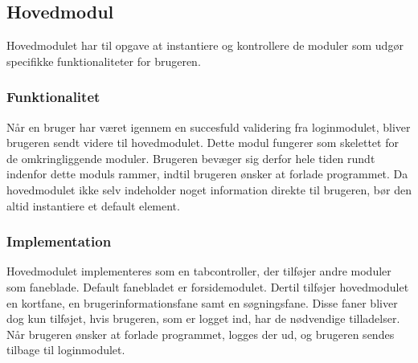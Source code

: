 \subsection{Hovedmodul}
\label{sub:hovedmodul}

Hovedmodulet har til opgave at instantiere og kontrollere de moduler som udgør specifikke funktionaliteter for brugeren.

\subsubsection{Funktionalitet}
\label{ssub:hovedmodul_funktionalitet}

Når en bruger har været igennem en succesfuld validering fra loginmodulet, bliver brugeren sendt videre til hovedmodulet.  Dette modul fungerer som skelettet for de omkringliggende moduler. Brugeren bevæger sig derfor hele tiden rundt indenfor dette moduls rammer, indtil brugeren ønsker at forlade programmet. Da hovedmodulet ikke selv indeholder noget information direkte til brugeren, bør den altid instantiere et default element.

\subsubsection{Implementation}
\label{ssub:hovedmodul_implementation}

Hovedmodulet implementeres som en tabcontroller, der tilføjer andre moduler som faneblade. Default fanebladet er forsidemodulet. Dertil tilføjer hovedmodulet en kortfane, en brugerinformationsfane samt en søgningsfane. Disse faner bliver dog kun tilføjet, hvis brugeren, som er logget ind, har de nødvendige tilladelser. Når brugeren ønsker at forlade programmet, logges der ud, og brugeren sendes tilbage til loginmodulet.
